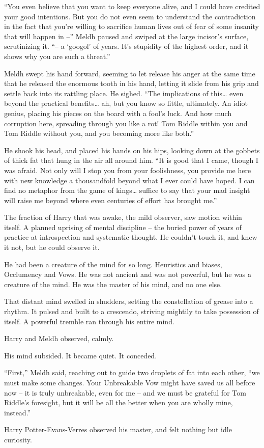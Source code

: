``You even believe that you want to keep everyone alive, and I could
have credited your good intentions. But you do not even seem to
understand the contradiction in the fact that you're willing to
sacrifice human lives out of fear of some insanity that will happen in
--'' Meldh paused and swiped at the large incisor's surface,
scrutinizing it. ``-- a `googol' of years. It's stupidity of the highest
order, and it shows why you are such a threat.''

Meldh swept his hand forward, seeming to let release his anger at the
same time that he released the enormous tooth in his hand, letting it
slide from his grip and settle back into its rattling place. He sighed.
``The implications of this\ldots{} even beyond the practical
benefits\ldots{} ah, but you know so little, ultimately. An idiot
genius, placing his pieces on the board with a fool's luck. And how much
corruption here, spreading through you like a rot! Tom Riddle within you
and Tom Riddle without you, and you becoming more like both.''

He shook his head, and placed his hands on his hips, looking down at the
gobbets of thick fat that hung in the air all around him. ``It is good
that I came, though I was afraid. Not only will I stop you from your
foolishness, you provide me here with new knowledge a thousandfold
beyond what I ever could have hoped. I can find no metaphor from the
game of kings\ldots{} suffice to say that your mad insight will raise me
beyond where even centuries of effort has brought me.''

The fraction of Harry that was awake, the mild observer, saw motion
within itself. A planned uprising of mental discipline -- the buried
power of years of practice at introspection and systematic thought. He
couldn't touch it, and knew it not, but he could observe it.

He had been a creature of the mind for so long. Heuristics and biases,
Occlumency and Vows. He was not ancient and was not powerful, but he was
a creature of the mind. He was the master of his mind, and no one else.

That distant mind swelled in shudders, setting the constellation of
grease into a rhythm. It pulsed and built to a crescendo, striving
mightily to take possession of itself. A powerful tremble ran through
his entire mind.

Harry and Meldh observed, calmly.

His mind subsided. It became quiet. It conceded.

``First,'' Meldh said, reaching out to guide two droplets of fat into
each other, ``we must make some changes. Your Unbreakable Vow might have
saved us all before now -- it is truly unbreakable, even for me -- and
we must be grateful for Tom Riddle's foresight, but it will be all the
better when you are wholly mine, instead.''

Harry Potter-Evans-Verres observed his master, and felt nothing but idle
curiosity.

